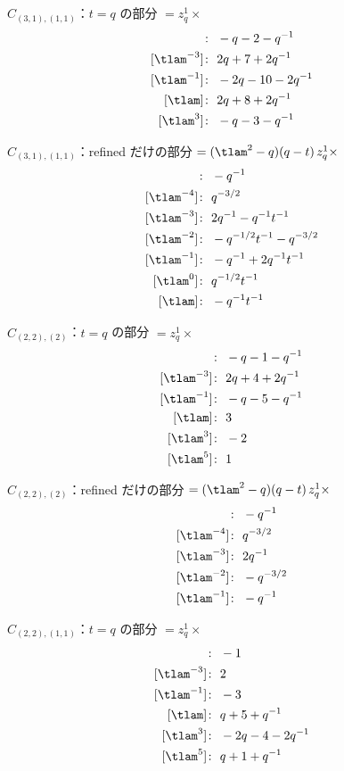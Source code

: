 $\hat C_{(3,1),(1,1)}$：$t = q$ の部分 $= z_q^{1} \times$
\begin{align*}
[\tlam^{-5}]\colon\ & -q -2 -q^{-1} \\
[\tlam^{-3}]\colon\ & 2 q +7 +2 q^{-1} \\
[\tlam^{-1}]\colon\ & -2 q -10 -2 q^{-1} \\
[\tlam]\colon\ & 2 q +8 +2 q^{-1} \\
[\tlam^{3}]\colon\ & -q -3 -q^{-1}
\end{align*}

$\hat C_{(3,1),(1,1)}$：refined だけの部分 $= (\tlam^2 - q)(q - t)\, z_q^{1} \times$
\begin{align*}
[\tlam^{-5}]\colon\ & -q^{-1} \\
[\tlam^{-4}]\colon\ & q^{-3/2} \\
[\tlam^{-3}]\colon\ & 2 q^{-1} -q^{-1} t^{-1} \\
[\tlam^{-2}]\colon\ & -q^{-1/2} t^{-1} -q^{-3/2} \\
[\tlam^{-1}]\colon\ & -q^{-1} +2 q^{-1} t^{-1} \\
[\tlam^{0}]\colon\ & q^{-1/2} t^{-1} \\
[\tlam]\colon\ & -q^{-1} t^{-1}
\end{align*}

$\hat C_{(2,2),(2)}$：$t = q$ の部分 $= z_q^{1} \times$
\begin{align*}
[\tlam^{-5}]\colon\ & -q -1 -q^{-1} \\
[\tlam^{-3}]\colon\ & 2 q +4 +2 q^{-1} \\
[\tlam^{-1}]\colon\ & -q -5 -q^{-1} \\
[\tlam]\colon\ & 3 \\
[\tlam^{3}]\colon\ & -2 \\
[\tlam^{5}]\colon\ & 1
\end{align*}

$\hat C_{(2,2),(2)}$：refined だけの部分 $= (\tlam^2 - q)(q - t)\, z_q^{1} \times$
\begin{align*}
[\tlam^{-5}]\colon\ & -q^{-1} \\
[\tlam^{-4}]\colon\ & q^{-3/2} \\
[\tlam^{-3}]\colon\ & 2 q^{-1} \\
[\tlam^{-2}]\colon\ & -q^{-3/2} \\
[\tlam^{-1}]\colon\ & -q^{-1}
\end{align*}

$\hat C_{(2,2),(1,1)}$：$t = q$ の部分 $= z_q^{1} \times$
\begin{align*}
[\tlam^{-5}]\colon\ & -1 \\
[\tlam^{-3}]\colon\ & 2 \\
[\tlam^{-1}]\colon\ & -3 \\
[\tlam]\colon\ & q +5 +q^{-1} \\
[\tlam^{3}]\colon\ & -2 q -4 -2 q^{-1} \\
[\tlam^{5}]\colon\ & q +1 +q^{-1}
\end{align*}

